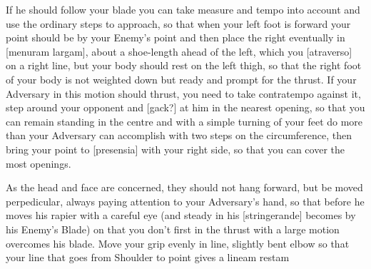 
If he should follow your blade you can take measure and tempo into
account and use the ordinary steps to approach, so that when your left
foot is forward your point should be by your Enemy's point and then
place the right eventually in [menuram largam], about a shoe-length
ahead of the left, which you [atraverso] on a right line,
but your body should rest on the left thigh, so that the right foot of
your body is not weighted down but ready and prompt for the thrust. If
your Adversary in this motion should thrust, you need to take
contratempo against it, step around your opponent and [gack?] at him
in the nearest opening, so that you can remain standing in the centre
and with a simple turning of your feet do more than your Adversary can
accomplish with two steps on the circumference, then bring your point
to [presensia] with your right side, so that you can cover the most
openings.


As the head and face are concerned, they should not hang forward, but
be moved perpedicular, always paying attention to your Adversary's
hand, so that before he moves his rapier with a careful eye (and
steady in his [stringerande] becomes by his Enemy's Blade) on that you
don't first in the thrust with a large motion overcomes his
blade. Move your grip evenly in line, slightly bent elbow so that your
line that goes from Shoulder to point gives a lineam restam
